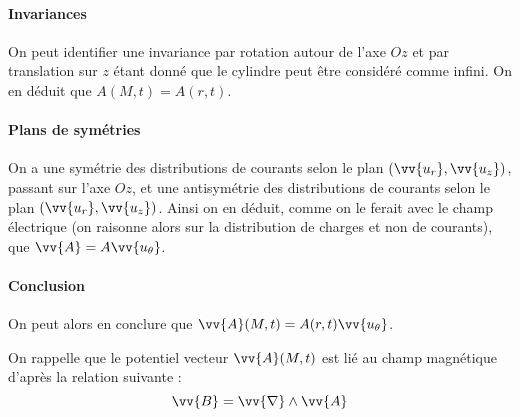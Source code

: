 \paragraph*{Invariances}
On peut identifier une invariance par rotation autour de l'axe $Oz$ et par translation sur $z$ étant donné que le cylindre peut être considéré comme infini. On en déduit que $A(M,t) = A(r,t)$.

\paragraph*{Plans de symétries}
On a une symétrie des distributions de courants selon le plan $\left( \vv{u_r}, \vv{u_z} \right)$, passant sur l'axe $Oz$, et une antisymétrie des distributions de courants selon le plan $\left( \vv{u_r}, \vv{u_z} \right)$. Ainsi on en déduit, comme on le ferait avec le champ électrique (on raisonne alors sur la distribution de charges et non de courants), que $\vv{A} = A \vv{u_\theta}$.

\paragraph*{Conclusion} On peut alors en conclure que $\vv{A} (M,t) = A(r,t) \vv{u_\theta}$.


On rappelle que le potentiel vecteur $\vv{A} (M,t)$ est lié au champ magnétique d'après la relation suivante :
\begin{equation}
  \vv{B} = \vv{\nabla} \wedge \vv{A}
\end{equation}

